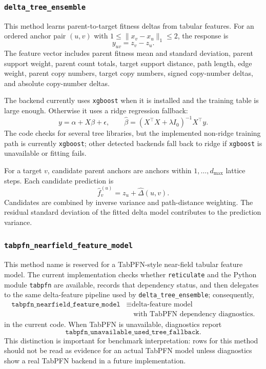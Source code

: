 \documentclass[11pt]{article}
\begin{document}
\subsubsection{\texttt{delta\_tree\_ensemble}}

This method learns parent-to-target fitness deltas from tabular features. For
an ordered anchor pair $(u,v)$ with $1\le \|x_v-x_u\|_1\le 2$, the response is
\[
  y_{uv}=z_v-z_u.
\]
The feature vector includes parent fitness mean and standard deviation, parent
support weight, parent count totals, target support distance, path length, edge
weight, parent copy numbers, target copy numbers, signed copy-number deltas,
and absolute copy-number deltas.

The backend currently uses \texttt{xgboost} when it is installed and the
training table is large enough. Otherwise it uses a ridge regression fallback:
\[
  y = \alpha + X\beta + \epsilon,\qquad
  \hat\beta
  =
  (X^\top X+\lambda I_0)^{-1}X^\top y.
\]
The code checks for several tree libraries, but the implemented non-ridge
training path is currently \texttt{xgboost}; other detected backends fall back
to ridge if \texttt{xgboost} is unavailable or fitting fails.

For a target $v$, candidate parent anchors are anchors within
$1,\ldots,d_{\max}$ lattice steps. Each candidate prediction is
\[
  \hat f_v^{(u)}
  =
  z_u+\widehat{\Delta}(u,v).
\]
Candidates are combined by inverse variance and path-distance weighting.
The residual standard deviation of the fitted delta model contributes to the
prediction variance.

\subsubsection{\texttt{tabpfn\_nearfield\_feature\_model}}

This method name is reserved for a TabPFN-style near-field tabular feature
model. The current implementation checks whether \texttt{reticulate} and the
Python module \texttt{tabpfn} are available, records that dependency status,
and then delegates to the same delta-feature pipeline used by
\texttt{delta\_tree\_ensemble}; consequently,
\[
\begin{aligned}
\texttt{tabpfn\_nearfield\_feature\_model}
&\equiv \text{delta-feature model}\\
&\quad \text{with TabPFN dependency diagnostics.}
\end{aligned}
\]
in the current code. When TabPFN is unavailable, diagnostics report
\[
  \texttt{tabpfn\_unavailable\_used\_tree\_fallback}.
\]
This distinction is important for benchmark interpretation: rows for this
method should not be read as evidence for an actual TabPFN model unless
diagnostics show a real TabPFN backend in a future implementation.
\end{document}

